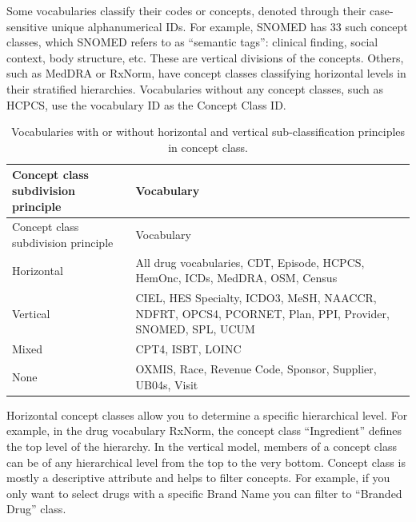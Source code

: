 \documentclass[
  letterpaper,
  paper=7in:10in,
  pagesize=pdftex,
  headinclude=on,
  footinclude=on,
  12pt]{scrbook}
\begin{document}
Some vocabularies classify their codes or concepts, denoted through
their case-sensitive unique alphanumerical IDs. For example, SNOMED has
33 such concept classes, which SNOMED refers to as ``semantic tags'':
clinical finding, social context, body structure, etc. These are
vertical divisions of the concepts. Others, such as MedDRA or RxNorm,
have concept classes classifying horizontal levels in their stratified
hierarchies. Vocabularies without any concept classes, such as HCPCS,
use the vocabulary ID as the Concept Class ID.

\begin{longtable}[]{@{}
  >{\raggedright\arraybackslash}p{}
  >{\raggedright\arraybackslash}p{}@{}}
\caption{Vocabularies with or without horizontal and vertical
sub-classification principles in concept
class.}\label{tbl-part-chapter-shorttableterm}\tabularnewline
\toprule\noalign{}
\begin{minipage}[b]{\linewidth}\raggedright
Concept class subdivision principle
\end{minipage} & \begin{minipage}[b]{\linewidth}\raggedright
Vocabulary
\end{minipage} \\
\midrule\noalign{}
\endfirsthead
\toprule\noalign{}
\begin{minipage}[b]{\linewidth}\raggedright
Concept class subdivision principle
\end{minipage} & \begin{minipage}[b]{\linewidth}\raggedright
Vocabulary
\end{minipage} \\
\midrule\noalign{}
\endhead
\bottomrule\noalign{}
\endlastfoot
Horizontal & All drug vocabularies, CDТ, Episode, HCPCS, HemOnc, ICDs,
MedDRA, OSM, Census \\
Vertical & CIEL, HES Specialty, ICDO3, MeSH, NAACCR, NDFRT, OPCS4,
PCORNET, Plan, PPI, Provider, SNOMED, SPL, UCUM \\
Mixed & CPT4, ISBT, LOINC \\
None & OXMIS, Race, Revenue Code, Sponsor, Supplier, UB04s, Visit \\
\end{longtable}

Horizontal concept classes allow you to determine a specific
hierarchical level. For example, in the drug vocabulary RxNorm, the
concept class ``Ingredient'' defines the top level of the hierarchy. In
the vertical model, members of a concept class can be of any
hierarchical level from the top to the very bottom. Concept class is
mostly a descriptive attribute and helps to filter concepts. For
example, if you only want to select drugs with a specific Brand Name you
can filter to ``Branded Drug'' class.
\end{document}
